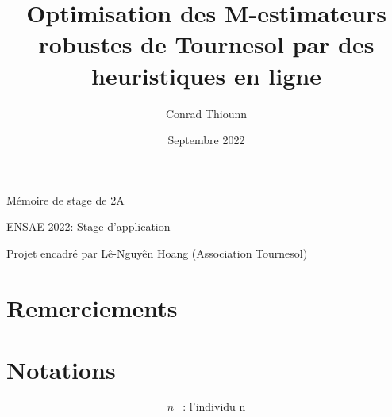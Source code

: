 \documentclass{article}
\title{Optimisation des M-estimateurs robustes de Tournesol par des heuristiques en ligne}
\author{
Conrad Thiounn }
\date{Septembre 2022}
\begin{document}
\begin{titlingpage}
\maketitle
\begin{center}
Mémoire de stage de 2A

ENSAE 2022: Stage d'application

\vspace{5mm}

Projet encadré par Lê-Nguyên Hoang (Association Tournesol)
\end{center}
\end{titlingpage}


\renewcommand*\contentsname{Table des matières}
\tableofcontents

\setlength\parskip{0.2 em} %

\pagebreak
{} %
\section*{Remerciements} 


\pagebreak

\printglossary[title=Glossaire et abréviations]

\clearpage

\pagebreak
{}
{}
\section*{Notations}

\newcommand{\si}{s_{\mathrm{image}}}
\newcommand{\li}{l_{\mathrm{image}}}

$$
\begin{aligned}
n & \text{: l'individu n} \\
\end{aligned}
$$

\pagebreak






\end{document}

